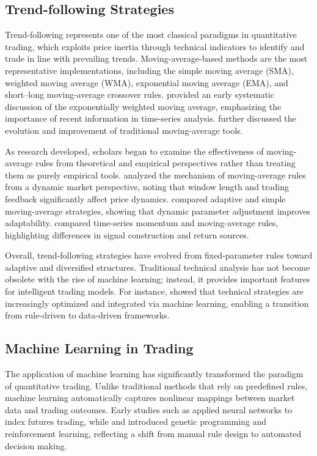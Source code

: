 \documentclass[12pt]{article}
\begin{document}
\subsection{Trend-following Strategies}

Trend-following represents one of the most classical paradigms in quantitative trading, which exploits price inertia through technical indicators to identify and trade in line with prevailing trends. Moving-average-based methods are the most representative implementations, including the simple moving average (SMA), weighted moving average (WMA), exponential moving average (EMA), and short--long moving-average crossover rules. \citet{Hunter1986} provided an early systematic discussion of the exponentially weighted moving average, emphasizing the importance of recent information in time-series analysis. \citet{Hansun2013} further discussed the evolution and improvement of traditional moving-average tools.

As research developed, scholars began to examine the effectiveness of moving-average rules from theoretical and empirical perspectives rather than treating them as purely empirical tools. \citet{ChiarellaHeHommes2006} analyzed the mechanism of moving-average rules from a dynamic market perspective, noting that window length and trading feedback significantly affect price dynamics. \citet{EllisParbery2005} compared adaptive and simple moving-average strategies, showing that dynamic parameter adjustment improves adaptability. \citet{MarshallNguyenVisaltanachoti2017} compared time-series momentum and moving-average rules, highlighting differences in signal construction and return sources.

Overall, trend-following strategies have evolved from fixed-parameter rules toward adaptive and diversified structures. Traditional technical analysis has not become obsolete with the rise of machine learning; instead, it provides important features for intelligent trading models. For instance, \citet{AyalaEtAl2021} showed that technical strategies are increasingly optimized and integrated via machine learning, enabling a transition from rule-driven to data-driven frameworks.

\subsection{Machine Learning in Trading}

The application of machine learning has significantly transformed the paradigm of quantitative trading. Unlike traditional methods that rely on predefined rules, machine learning automatically captures nonlinear mappings between market data and trading outcomes. Early studies such as \citet{TrippiDeSieno1992} applied neural networks to index futures trading, while \citet{DempsterJones2001} and \citet{DempsterLeemans2006} introduced genetic programming and reinforcement learning, reflecting a shift from manual rule design to automated decision making.
\end{document}
